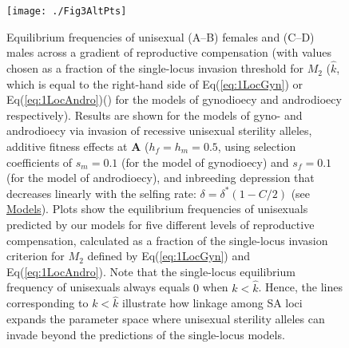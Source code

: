 \documentclass{article}
\begin{document}
\begin{figure}[htbp]
\centering
\texttt{[image: ./Fig3AltPts]}
\caption{Equilibrium frequencies of unisexual (A--B) females and (C--D) males across a gradient of reproductive compensation (with values chosen as a fraction of the single-locus invasion threshold for $M_2$ ($\hat{k}$, which is equal to the right-hand side of Eq(\ref{eq:1LocGyn}) or Eq(\ref{eq:1LocAndro})() for the models of gynodioecy and androdioecy respectively). Results are shown for the models of gyno- and androdioecy via invasion of recessive unisexual sterility alleles, additive fitness effects at $\mathbf{A}$ ($h_f = h_m = 0.5$, using selection coefficients of $s_m = 0.1$ (for the model of gynodioecy) and $s_f = 0.1$ (for the model of androdioecy), and inbreeding depression that decreases linearly with the selfing rate: $\delta = \delta^\ast(1 - C/2)$ (see \hyperref[sec:Models]{Models}). Plots show the equilibrium frequencies of unisexuals predicted by our models for five different levels of reproductive compensation, calculated as a fraction of the single-locus invasion criterion for $M_2$ defined by Eq(\ref{eq:1LocGyn}) and Eq(\ref{eq:1LocAndro}). Note that the single-locus equilibrium frequency of unisexuals always equals $0$ when $k < \hat{k}$. Hence, the lines corresponding to $k < \hat{k}$ illustrate how linkage among SA loci expands the parameter space where unisexual sterility alleles can invade beyond the predictions of the single-locus models.}
\label{fig:eqFreq}
\end{figure}
\end{document}
